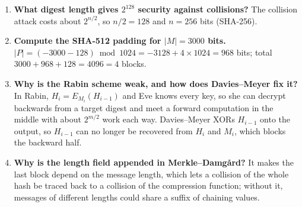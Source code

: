 \begin{enumerate}[leftmargin=*]
  \item \textbf{What digest length gives $2^{128}$ security against collisions?} The collision attack costs about $2^{n/2}$, so $n/2 = 128$ and $n = 256$ bits (SHA-256).
  \item \textbf{Compute the SHA-512 padding for $|M| = 3000$ bits.} $|P| = (-3000 - 128) \bmod 1024 = -3128 + 4 \times 1024 = 968$ bits; total $3000 + 968 + 128 = 4096 = 4$ blocks.
  \item \textbf{Why is the Rabin scheme weak, and how does Davies--Meyer fix it?} In Rabin, $H_i = E_{M_i}(H_{i-1})$ and Eve knows every key, so she can decrypt backwards from a target digest and meet a forward computation in the middle with about $2^{m/2}$ work each way. Davies--Meyer XORs $H_{i-1}$ onto the output, so $H_{i-1}$ can no longer be recovered from $H_i$ and $M_i$, which blocks the backward half.
  \item \textbf{Why is the length field appended in Merkle--Damg\aa rd?} It makes the last block depend on the message length, which lets a collision of the whole hash be traced back to a collision of the compression function; without it, messages of different lengths could share a suffix of chaining values.
\end{enumerate}
